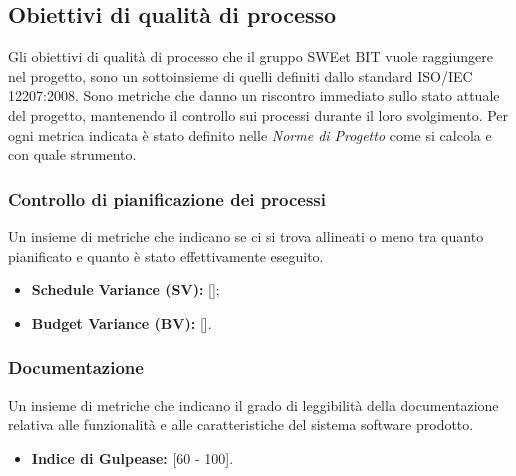 \subsection{Obiettivi di qualità di processo}  
Gli obiettivi di qualità di processo che il gruppo SWEet BIT vuole raggiungere nel progetto, sono un sottoinsieme di quelli definiti dallo standard ISO/IEC 12207:2008.
Sono metriche che danno un riscontro immediato sullo stato attuale del progetto, mantenendo il controllo sui processi durante il loro svolgimento.
Per ogni metrica indicata è stato definito nelle \emph{Norme di Progetto}\VersioneNP{} come si calcola e con quale strumento.

\subsubsection{Controllo di pianificazione dei processi}
Un insieme di metriche che indicano se ci si trova allineati o meno tra quanto pianificato e quanto è stato effettivamente eseguito.
\begin{itemize}
\item \textbf{Schedule Variance (SV): }[];
\item \textbf{Budget Variance (BV): }[].
\end{itemize}

\subsubsection{Documentazione}
Un insieme di metriche che indicano il grado di leggibilità della documentazione relativa alle funzionalità e alle caratteristiche del sistema software prodotto.
\begin{itemize}
\item \textbf{Indice di Gulpease: }[60 - 100].
\end{itemize}

